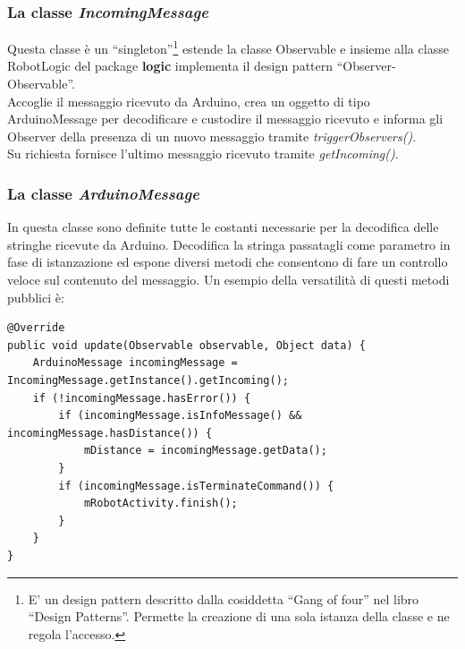  \subsubsection{La classe \emph{IncomingMessage}}
 Questa classe è un ``singleton''\footnote{E' un design pattern descritto dalla 
 cosiddetta ``Gang of four'' nel libro ``Design Patterns''. 
 Permette la creazione di una sola istanza della classe e ne regola l'accesso. } 
 estende la classe Observable e insieme alla classe RobotLogic del 
 package \textbf{logic} implementa il design pattern ``Observer-Observable''. 
 \\Accoglie il messaggio ricevuto da Arduino, crea un oggetto di tipo ArduinoMessage 
 per decodificare e custodire il messaggio ricevuto e informa gli Observer della presenza 
 di un nuovo messaggio tramite \emph{triggerObservers()}.\\
 Su richiesta fornisce l'ultimo messaggio ricevuto tramite \emph{getIncoming()}.
 \subsubsection{La classe \emph{ArduinoMessage}}
 In questa classe sono definite tutte le costanti necessarie per la 
 decodifica delle stringhe ricevute da Arduino. 
 Decodifica la stringa passatagli come parametro in fase di istanzazione ed 
 espone diversi metodi che consentono di fare un controllo veloce sul contenuto del messaggio.
 Un esempio della versatilità di questi metodi pubblici è:  
 \lstset{language=Java}

\begin{lstlisting}[caption=Metodo \emph{update()} di RobotLogic del 
pacchetto \textbf{logic}]
@Override
public void update(Observable observable, Object data) {
    ArduinoMessage incomingMessage = IncomingMessage.getInstance().getIncoming();
    if (!incomingMessage.hasError()) {
        if (incomingMessage.isInfoMessage() && incomingMessage.hasDistance()) {
            mDistance = incomingMessage.getData();
        }
        if (incomingMessage.isTerminateCommand()) {
            mRobotActivity.finish();
        }
    }
}
\end{lstlisting}

